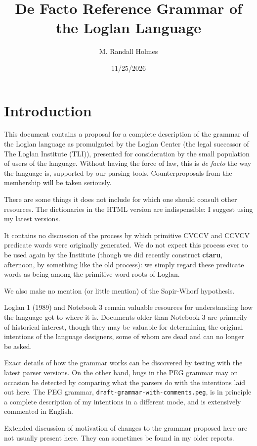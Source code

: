 \documentclass[12pt]{book}
\title{De Facto Reference Grammar of the Loglan Language}
\author{M. Randall Holmes}
\date{11/25/2026}
\begin{document}
\maketitle

\tableofcontents

\chapter{Introduction}

This document contains a proposal for a complete description of the grammar of the Loglan language as promulgated by the Loglan Center (the legal successor of The Loglan Institute (TLI)), presented
for consideration by the small population of users of the language.  Without having the force of law, this is {\em de facto\/} the way the language is, supported by our parsing tools.   Counterproposals from the membership will be taken seriously.

There are some things it does not include for which one should consult other resources.  The dictionaries in the HTML version are indispensible:  I suggest using my latest versions.

It contains no discussion of the process by which primitive CVCCV and CCVCV predicate words were originally generated.  We do not expect this process ever to be used again by the Institute (though we did recently construct {\bf ctaru}, afternoon, by something like the old process):  we simply regard these predicate words as being among the primitive word roots of Loglan.

We also make no mention (or little mention) of the Sapir-Whorf hypothesis.

Loglan 1 (1989) and Notebook 3 remain valuable resources for understanding how the language got to where it is.   Documents older than Notebook 3 are primarily of historical interest, though they may be valuable for determining the original intentions of the language designers, some of whom are dead and can no longer be asked.

Exact details of how the grammar works can be discovered by testing with the latest parser versions.  On the other hand, bugs in the PEG grammar may on occasion be detected by comparing what the parsers do with the intentions laid out here.  The PEG grammar, {\tt draft-grammar-with-comments.peg}, is in principle a complete description of my intentions in a different mode, and is extensively commented in English.

Extended discussion of motivation of changes to the grammar proposed here are not usually present here.  They can sometimes be found in my older reports.
\end{document}
